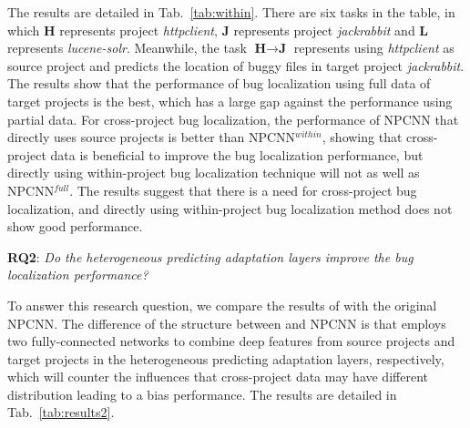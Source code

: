 The results are detailed in Tab.~\ref{tab:within}. There are six tasks in the table, in which $\textbf{H}$ represents project \textit{httpclient}, $\textbf{J}$ represents project \textit{jackrabbit} and $\textbf{L}$ represents \textit{lucene-solr}. Meanwhile, the task $\textbf{H} \rightarrow \textbf{J}$ represents using \textit{httpclient} as source project and predicts the location of buggy files in target project \textit{jackrabbit}. The results show that the performance of bug localization using full data of target projects is the best, which has a large gap against the performance using partial data. For cross-project bug localization, the performance of NPCNN that directly uses source projects is better than NPCNN$^{within}$, showing that cross-project data is beneficial to improve the bug localization performance, but directly using within-project bug localization technique will not as well as NPCNN$^{full}$. The results suggest that there is a need for cross-project bug localization, and directly using within-project bug localization method does not show good performance.

\textbf{RQ2}: \textit{Do the heterogeneous predicting adaptation layers improve the bug localization performance?}

To answer this research question, we compare the results of \TRANPCNN with the original NPCNN. The difference of the structure between \TRANPCNN and NPCNN is that \TRANPCNN employs two fully-connected networks to combine deep features from source projects and target projects in the heterogeneous predicting adaptation layers, respectively, which will counter the influences that cross-project data may have different distribution leading to a bias performance. The results are detailed in Tab.~\ref{tab:results2}.



